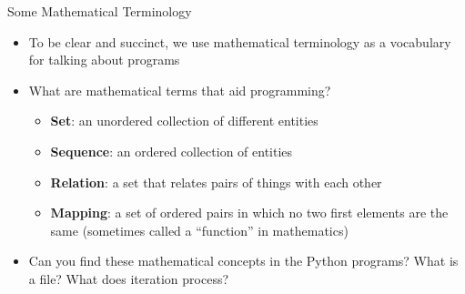 \documentclass[14pt,aspectratio=169]{beamer}
\begin{document}
%
\begin{frame}{Some Mathematical Terminology}
  \begin{itemize}
    \item To be clear and succinct, we use mathematical terminology as a
      vocabulary for talking about programs
      \vspace*{-.15in}
    \item What are mathematical terms that aid programming?
      \begin{itemize}
        \item {\bf Set}: an unordered collection of different entities
        \item {\bf Sequence}: an ordered collection of entities
        \item {\bf Relation}: a set that relates pairs of things with each other
        \item {\bf Mapping}: a set of ordered pairs in which no two first
          elements are the same (sometimes called a ``function'' in mathematics)
      \end{itemize}
      \vspace*{-.2in}
    \item Can you find these mathematical concepts in the Python programs?
      What is a file? What does iteration process?
  \end{itemize}
\end{frame}
\end{document}

